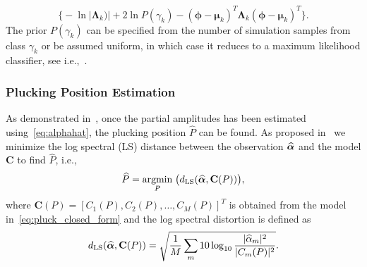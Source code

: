 \documentclass{article}
\begin{document}
\begin{sloppy}
\begin{equation}
\bigg\{ -\ln \lvert \boldsymbol{\Lambda}_k) \rvert + 2 \ln P(\gamma_k) - (\boldsymbol{\phi}-\boldsymbol{\mu}_k)^T \boldsymbol{\Lambda}_k (\boldsymbol{\phi}-\boldsymbol{\mu}_k)^T    %
\bigg\}.
\end{equation}
%
The prior $P(\gamma_k)$ can be specified from the number of simulation samples from class $\gamma_k$ or be assumed uniform, in which case it reduces to a maximum likelihood classifier, see i.e.,~\cite{mspr}.
%
\vspace{-.8mm}
\subsubsection{Plucking Position Estimation} %
\label{sec:proposed_estimation_of_pluck_amplitude}
\vspace{-.6mm}
As demonstrated in~\cite{hjerrild::icassp19}, once the partial amplitudes has been estimated using~\eqref{eq:alphahat}, the plucking position $\widehat{P}$ can be found. As proposed in~\cite{hjerrild::icassp19} we minimize the log spectral (LS) distance between the observation $\text{\boldmath${\widehat\alpha}$}$ and the model $\mathbf{C}$ to find $\widehat{P}$, i.e., 
\begin{equation}
    \widehat{P} = \underset{P}{\operatorname{argmin}}\;{\big(d_{\textup{LS}}(\text{\boldmath${\widehat\alpha}$},\mathbf{C}(P))\big)},
\end{equation}
where $\mathbf{C}(P) = [C_1(P),C_2(P),\dots,C_M(P)]^T$ is obtained from the model in~\eqref{eq:pluck_closed_form} and the log spectral distortion is defined as
\begin{equation}
    d_{\textup{LS}}(\text{\boldmath${\widehat\alpha}$},\mathbf{C}(P)) = \sqrt{ \frac{1}{M} \sum_m 10\log_{10} \frac{\lvert\widehat{\alpha}_m\rvert^2}{\lvert C_m(P)\rvert^2} }.
\end{equation} 
%
%
%
%
%
%

\end{sloppy}
\end{document}
